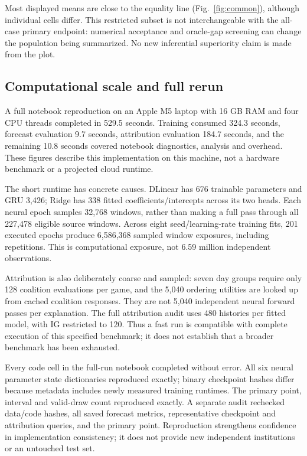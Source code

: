 \documentclass[conference]{IEEEtran}
\begin{document}
Most displayed means are close to the equality line (Fig.~\ref{fig:common}), although individual cells differ. This restricted subset is not interchangeable with the all-case primary endpoint: numerical acceptance and oracle-gap screening can change the population being summarized. No new inferential superiority claim is made from the plot.

\subsection{Computational scale and full rerun}\label{sec:runtime}
A full notebook reproduction on an Apple M5 laptop with 16 GB RAM and four CPU threads completed in 529.5 seconds. Training consumed 324.3 seconds, forecast evaluation 9.7 seconds, attribution evaluation 184.7 seconds, and the remaining 10.8 seconds covered notebook diagnostics, analysis and overhead. These figures describe this implementation on this machine, not a hardware benchmark or a projected cloud runtime.

The short runtime has concrete causes. DLinear has 676 trainable parameters and GRU 3,426; Ridge has 338 fitted coefficients/intercepts across its two heads. Each neural epoch samples 32,768 windows, rather than making a full pass through all 227,478 eligible source windows. Across eight seed/learning-rate training fits, 201 executed epochs produce 6,586,368 sampled window exposures, including repetitions. This is computational exposure, not 6.59 million independent observations.

Attribution is also deliberately coarse and sampled: seven day groups require only 128 coalition evaluations per game, and the 5,040 ordering utilities are looked up from cached coalition responses. They are not 5,040 independent neural forward passes per explanation. The full attribution audit uses 480 histories per fitted model, with IG restricted to 120. Thus a fast run is compatible with complete execution of this specified benchmark; it does not establish that a broader benchmark has been exhausted.

Every code cell in the full-run notebook completed without error. All six neural parameter state dictionaries reproduced exactly; binary checkpoint hashes differ because metadata includes newly measured training runtimes. The primary point, interval and valid-draw count reproduced exactly. A separate audit rechecked data/code hashes, all saved forecast metrics, representative checkpoint and attribution queries, and the primary point. Reproduction strengthens confidence in implementation consistency; it does not provide new independent institutions or an untouched test set.
\end{document}
